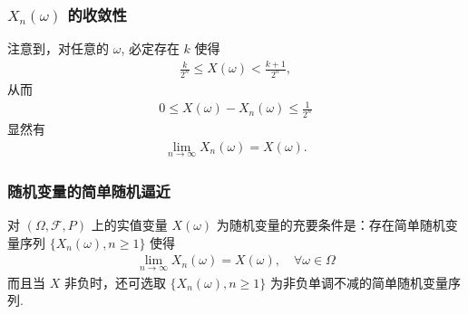 \begin{frame}
	\frametitle{$X_n (\omega)$ 的收敛性}
	注意到，对任意的 $\omega$, 必定存在 $k$ 使得
	\begin{eqnarray*}
		\frac{k}{2^n}\le X(\omega)<\frac{k+1}{2^n},
	\end{eqnarray*}
	\pause 从而
	\begin{eqnarray*}
		0\le X(\omega)-X_n(\omega)\le \frac{1}{2^n}
	\end{eqnarray*}
	\pause 显然有
	\begin{eqnarray*}
		\lim_{n\rightarrow \infty}X_n(\omega)=X(\omega).
	\end{eqnarray*}
\end{frame}
\begin{frame}
	\frametitle{随机变量的简单随机逼近}
	\begin{thm}
		对 $(\Omega,\mathcal{F},P)$ 上的实值变量 $X (\omega)$ 为随机变量的充要条件是：存在简单随机变量序列 $\{X_n (\omega),n\ge 1\}$ 使得
		\begin{eqnarray*}
			\lim_{n\rightarrow \infty}X_n(\omega)=X(\omega), \quad \forall \omega\in \Omega
		\end{eqnarray*}
		而且当 $X$ 非负时，还可选取 $\{X_n (\omega),n\ge 1\}$ 为非负单调不减的简单随机变量序列.
	\end{thm}
\end{frame}



